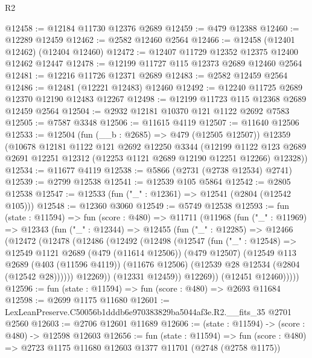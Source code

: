\begin{lexlean}{R2}
\begin{coremodule}
@12458 := @12184 @11730 @12376 @2689
@12459 := @479 @12388
@12460 := @12289 @12459
@12462 := @2582 @12460 @2564
@12466 := @12458 (@12401 @12462) (@12404 @12460)
@12472 := @12407 @11729 @12352 @12375 @12400 @12462 @12447
@12478 := @12199 @11727 @115 @12373 @2689 @12460 @2564
@12481 := @12216 @11726 @12371 @2689
@12483 := @2582 @12459 @2564
@12486 := @12481 (@12221 @12483) @12460
@12492 := @12240 @11725 @2689 @12370 @12190 @12483 @12267
@12498 := @12199 @11723 @115 @12368 @2689 @12459 @2564
@12504 := @2932 @12181 @10370 @121 @1122 @2692 @7583
@12505 := @7587 @3348
@12506 := @11615 @4119
@12507 := @11640 @12506
@12533 := @12504
    (fun (__b : @2685) => @479 (@12505 @12507))
    @12359
    (@10678
      @12181
      @1122
      @121
      @2692
      @12250
      @3344
      (@12199
        @1122
        @123
        @2689
        @2691
        @12251
        @12312
        (@12253 @1121 @2689 @12190 @12251 @12266)
        @12328))
@12534 := @11677 @4119
@12538 := @5866 (@2731 (@2738 @12534) @2741)
@12539 := @2799 @12538
@12541 := @12539 @105 @5864
@12542 := @2805 @12538
@12547 := @12533 (fun ("_" : @12361) => @12541 (@2804 (@12542 @105)))
@12548 := @12360 @3060
@12549 := @5749 @12538
@12593 := fun (state : @11594) =>
  fun (score : @480) =>
  @11711
    (@11968
      (fun ("_" : @11969) =>
      @12343
        (fun ("_" : @12344) =>
        @12455
          (fun ("_" : @12285) =>
          @12466
            (@12472
              (@12478
                (@12486
                  (@12492
                    (@12498
                      (@12547
                        (fun ("_" : @12548) =>
                        @12549
                          @1121
                          @2689
                          (@479 (@11614 @12506))
                          (@479 @12507)
                          (@12549
                            @113
                            @2689
                            (@403 (@11596 @4119))
                            (@11676 @12506)
                            (@12539 @28 @12534 (@2804 (@12542 @28))))))
                      @12269))
                  (@12331 @12459))
                @12269))
            (@12451 @12460)))))
@12596 := fun (state : @11594) => fun (score : @480) => @2693 @11684
@12598 := @2699 @1175 @11680
@12601 := LexLeanPreserve.C50056b1dddb6e970383829ba5044af3e.R2.__fits_35 @2701 @2560
@12603 := @2706 @12601 @11689
@12606 := (state : @11594) -> (score : @480) -> @12598 @12603
@12656 := fun (state : @11594) =>
  fun (score : @480) =>
  @2723
    @1175
    @11680
    @12603
    @1377
    @11701
    (@2748 (@2758 @1175))

\end{coremodule}
\end{lexlean}
